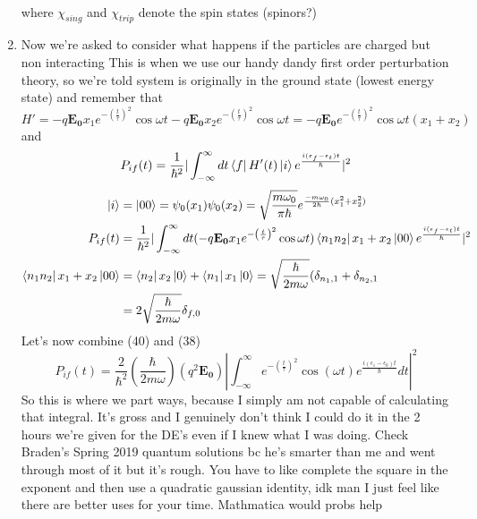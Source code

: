 \documentclass{article}
\begin{document}
\begin{enumerate}[label=\alph*)]
\begin{align}
	\end{align}
	where $\chi_{sing}$ and $\chi_{trip}$ denote the spin states (spinors?)
	\item Now we're asked to consider what happens if the particles are charged but non interacting
	This is when we use our handy dandy first order perturbation theory, so we're told system is originally in the ground state (lowest energy state) and remember that
	\[
	H' = -q\mathbf{E_0}x_1e^{-\left(\frac{t}{\tau}\right)^2}\cos\omega t - q\mathbf{E_0}x_2e^{-\left(\frac{t}{\tau}\right)^2}\cos\omega t = -q\mathbf{E_0}e^{-\left(\frac{t}{\tau}\right)^2}\cos\omega t (x_1 + x_2)
	\]
	and 
	\[
	P_{if}(t) = \frac{1}{\hbar^2} | \int_{-\infty}^{\infty}dt\bra{f}H'(t)\ket{i}e^{\frac{i(\epsilon_{f} - \epsilon_{t})t}{\hbar}}|^2
	\]
	\begin{align}
		\ket{i} &= \ket{00} = \psi_{0}(x_1) \psi_{0}(x_2) = \sqrt{\frac{m\omega_0}{\pi \hbar}}e^{\frac{-m\omega_0}{2\hbar}(x_1^2 + x_2^2)} \\
		P_{if}(t) &= \frac{1}{\hbar^2} | \int_{-\infty}^{\infty}dt(-q\mathbf{E_0}x_1e^{-\left(\frac{t}{\tau}\right)^2}\cos\omega t)\bra{n_1 n_2}x_1 + x_2 \ket{00}e^{\frac{i(\epsilon_{f} - \epsilon_{t})t}{\hbar}}|^2 \\
		\bra{n_1 n_2}x_1 + x_2 \ket{00} &= \bra{n_2}x_2\ket{0} + \bra{n_1}x_1\ket{0} = \sqrt{\frac{\hbar}{2m\omega}}(\delta_{n_1,1} + \delta_{n_2,1} \\
		&= 2\sqrt{\frac{\hbar}{2m\omega}}\delta_{f,0}
	\end{align}
	Let's now combine (40) and (38)
	\[
	P_{if}(t) = \frac{2}{\hbar^2}\left(\frac{\hbar}{2m\omega}\right)(q^2\mathbf{E_0}) | \int_{-\infty}^{\infty} e^{-\left(\frac{t}{\tau}\right)^2}\cos(\omega t) e^{\frac{i(\epsilon_{1} - \epsilon_{0})t}{\hbar}}dt|^2
	\]
	So this is where we part ways, because I simply am not capable of calculating that integral. It's gross and I genuinely don't think I could do it in the 2 hours we're given for the DE's even if I knew what I was doing. Check Braden's Spring 2019 quantum solutions bc he's smarter than me and went through most of it but it's rough. You have to like complete the square in the exponent and then use a quadratic gaussian identity, idk man I just feel like there are better uses for your time. Mathmatica would probs help
\end{enumerate}

\end{document}
